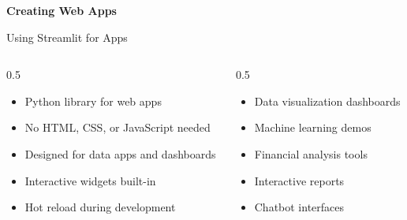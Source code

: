 \documentclass[aspectratio=169]{beamer}
\begin{document}

\begin{frame}[plain]
\vfill
\begin{center}
{\fontsize{36}{40}\selectfont\bfseries\color{titlegray} Creating Web Apps}
\end{center}
\vfill
\end{frame}

\begin{frame}{Using Streamlit for Apps}
\begin{columns}[T]
\begin{column}{0.5\textwidth}
\begin{shadedbox}[title=\textbf{Streamlit Overview}]
\begin{itemize}\small
  \item Python library for web apps
  \item No HTML, CSS, or JavaScript needed
  \item Designed for data apps and dashboards
  \item Interactive widgets built-in
  \item Hot reload during development
\end{itemize}
\end{shadedbox}
\end{column}
\begin{column}{0.5\textwidth}
\begin{shadedbox}[title=\textbf{Perfect For}]
\begin{itemize}\small
  \item Data visualization dashboards
  \item Machine learning demos
  \item Financial analysis tools
  \item Interactive reports
  \item Chatbot interfaces
\end{itemize}
\end{shadedbox}
\end{column}
\end{columns}
\end{frame}
\end{document}
